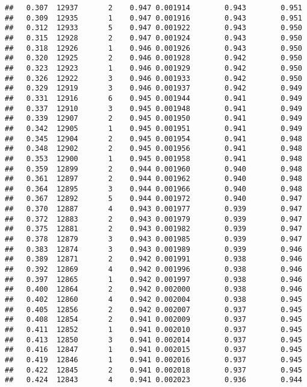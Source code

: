 \documentclass[
]{book}
\begin{document}
\begin{verbatim}
##   0.307  12937       2    0.947 0.001914        0.943        0.951
##   0.309  12935       1    0.947 0.001916        0.943        0.951
##   0.312  12933       5    0.947 0.001922        0.943        0.950
##   0.315  12928       2    0.947 0.001924        0.943        0.950
##   0.318  12926       1    0.946 0.001926        0.943        0.950
##   0.320  12925       2    0.946 0.001928        0.942        0.950
##   0.323  12923       1    0.946 0.001929        0.942        0.950
##   0.326  12922       3    0.946 0.001933        0.942        0.950
##   0.329  12919       3    0.946 0.001937        0.942        0.949
##   0.331  12916       6    0.945 0.001944        0.941        0.949
##   0.337  12910       3    0.945 0.001948        0.941        0.949
##   0.339  12907       2    0.945 0.001950        0.941        0.949
##   0.342  12905       1    0.945 0.001951        0.941        0.949
##   0.345  12904       2    0.945 0.001954        0.941        0.948
##   0.348  12902       2    0.945 0.001956        0.941        0.948
##   0.353  12900       1    0.945 0.001958        0.941        0.948
##   0.359  12899       2    0.944 0.001960        0.940        0.948
##   0.361  12897       2    0.944 0.001962        0.940        0.948
##   0.364  12895       3    0.944 0.001966        0.940        0.948
##   0.367  12892       5    0.944 0.001972        0.940        0.947
##   0.370  12887       4    0.943 0.001977        0.939        0.947
##   0.372  12883       2    0.943 0.001979        0.939        0.947
##   0.375  12881       2    0.943 0.001982        0.939        0.947
##   0.378  12879       3    0.943 0.001985        0.939        0.947
##   0.383  12874       3    0.943 0.001989        0.939        0.946
##   0.389  12871       2    0.942 0.001991        0.938        0.946
##   0.392  12869       4    0.942 0.001996        0.938        0.946
##   0.397  12865       1    0.942 0.001997        0.938        0.946
##   0.400  12864       2    0.942 0.002000        0.938        0.946
##   0.402  12860       4    0.942 0.002004        0.938        0.945
##   0.405  12856       2    0.942 0.002007        0.937        0.945
##   0.408  12854       2    0.941 0.002009        0.937        0.945
##   0.411  12852       1    0.941 0.002010        0.937        0.945
##   0.413  12850       3    0.941 0.002014        0.937        0.945
##   0.416  12847       1    0.941 0.002015        0.937        0.945
##   0.419  12846       1    0.941 0.002016        0.937        0.945
##   0.422  12845       2    0.941 0.002018        0.937        0.945
##   0.424  12843       4    0.941 0.002023        0.936        0.944

\end{verbatim}
\end{document}
